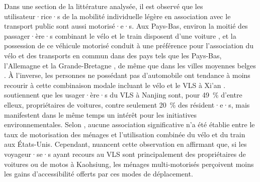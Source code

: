 \begin{refsegment}
Dans une section de la littérature analysée, il est observé que les utilisateur·rice·s de la mobilité individuelle légère en association avec le transport public sont aussi motorisé·e·s. Aux Pays-Bas, environ la moitié des passager·ère·s combinant le vélo et le train disposent d'une voiture \textcolor{blue}{\autocite[362]{givoni_access_2007}}, et la possession de ce véhicule motorisé conduit à une préférence pour l'association du vélo et des transports en commun dans des pays tels que les Pays-Bas, l'Allemagne et la Grande-Bretagne \textcolor{blue}{\autocite[289]{martens_bicycle_2004}}, de même que dans les villes moyennes belges \textcolor{blue}{\autocite[6]{adnan_last-mile_2019}}. À l'inverse, les personnes ne possédant pas d'automobile ont tendance à moins recourir à cette combinaison modale incluant le vélo et le \acrshort{VLS} à Xi'an \textcolor{blue}{\autocite[172]{yang_bike-and-ride_2014}}. \textcolor{blue}{\textcite[7]{yang_empirical_2016}} soutiennent que les usager·ère·s du \acrshort{VLS} à Nanjing sont, pour 49~\% d'entre elleux, propriétaires de voitures, contre seulement 20~\% des résident·e·s, mais manifestent dans le même temps un intérêt pour les initiatives environnementales. Selon \textcolor{blue}{\textcite[115]{wang_bicycle-transit_2013}}, aucune association significative n'a été établie entre le taux de motorisation des ménages et l'utilisation combinée du vélo et du train aux États-Unis. Cependant, \textcolor{blue}{\textcite[22]{cheng_expanding_2018}} nuancent cette observation en affirmant que, si les voyageur·se·s ayant recours au \acrshort{VLS} sont principalement des propriétaires de voitures ou de motos à Kaohsiung, les ménages multi-motorisés perçoivent moins les gains d'accessibilité offerts par ces modes de déplacement.%


\end{refsegment}

